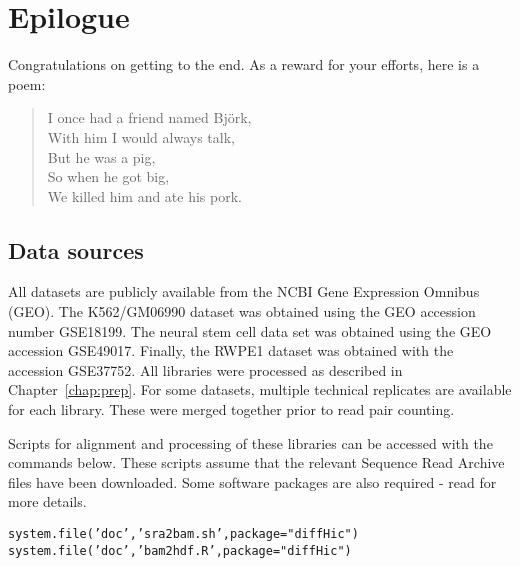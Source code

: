 \documentclass{report}\usepackage[]{graphicx}\usepackage[usenames,dvipsnames]{color}
\newcommand{\hlstr}[1]{\textcolor[rgb]{0.251,0.627,0.251}{#1}}%
\newcommand{\hlstd}[1]{\textcolor[rgb]{0.251,0.251,0.251}{#1}}%
\newcommand{\hlkwc}[1]{\textcolor[rgb]{0.251,0.251,0.251}{#1}}%
\newcommand{\hlkwd}[1]{\textcolor[rgb]{0.878,0.439,0.125}{#1}}%
\newenvironment{knitrout}{}{} %
\newenvironment{combox}
{ \definecolor{shadecolor}{RGB}{255, 240, 240} \begin{shaded}\begin{center}\begin{minipage}[t]{0.95\textwidth} }
{ \end{minipage}\end{center}\end{shaded} \definecolor{shadecolor}{RGB}{240,240,240} }
\begin{document}

\chapter{Epilogue}

\begin{combox}
Congratulations on getting to the end.
As a reward for your efforts, here is a poem:
\begin{quote}
I once had a friend named Bj\"ork, \\
With him I would always talk, \\
But he was a pig, \\
So when he got big, \\
We killed him and ate his pork.
\end{quote}
\end{combox}

\section{Data sources}
All datasets are publicly available from the NCBI Gene Expression Omnibus (GEO).
The K562/GM06990 dataset \cite{lieberman2009comprehensive} was obtained using the GEO accession number GSE18199.
The neural stem cell data set \cite{sofueva2013cohesin} was obtained using the GEO accession GSE49017.
Finally, the RWPE1 dataset  \cite{rickman2012oncogene} was obtained with the accession GSE37752.
All libraries were processed as described in Chapter~\ref{chap:prep}.
For some datasets, multiple technical replicates are available for each library.
These were merged together prior to read pair counting.

Scripts for alignment and processing of these libraries can be accessed with the commands below.
These scripts assume that the relevant Sequence Read Archive files have been downloaded.
Some software packages are also required - read  for more details.

\begin{knitrout}
\color{fgcolor}\begin{kframe}
\begin{alltt}
\hlkwd{system.file}\hlstd{(}\hlstr{'doc'}\hlstd{,} \hlstr{'sra2bam.sh'}\hlstd{,} \hlkwc{package}\hlstd{=}\hlstr{"diffHic"}\hlstd{)}
\hlkwd{system.file}\hlstd{(}\hlstr{'doc'}\hlstd{,} \hlstr{'bam2hdf.R'}\hlstd{,} \hlkwc{package}\hlstd{=}\hlstr{"diffHic"}\hlstd{)}
\end{alltt}
\end{kframe}
\end{knitrout}
\end{document}

